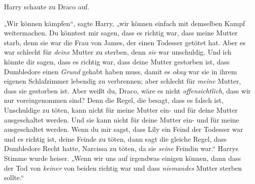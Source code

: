 Harry schaute zu Draco auf.

„Wir können kämpfen“, sagte Harry, „wir können einfach mit demselben Kampf weitermachen. Du könntest mir sagen, dass es richtig war, dass meine Mutter starb, denn sie war die Frau von James, der einen Todesser getötet hat. Aber es war schlecht für \emph{deine} Mutter zu sterben, denn \emph{sie} war unschuldig. Und ich könnte dir sagen, dass es richtig war, dass deine Mutter gestorben ist, dass Dumbledore einen \emph{Grund} gehabt haben muss, damit es \emph{okay} war sie in ihrem eigenen Schlafzimmer lebendig zu verbrennen; aber schlecht für \emph{meine} Mutter, dass sie gestorben ist. Aber weißt du, Draco, wäre es nicht \emph{offensichtlich}, dass wir nur voreingenommen sind? Denn die Regel, die besagt, dass es falsch ist, Unschuldige zu töten, kann nicht für meine Mutter ein- und für deine Mutter ausgeschaltet werden. Und sie kann nicht für deine Mutter ein- und für meine ausgeschaltet werden. Wenn du mir sagst, dass Lily ein Feind der Todesser war und es richtig ist, deine Feinde zu töten, dann sagt die gleiche Regel, dass Dumbledore Recht hatte, Narcissa zu töten, da sie \emph{seine} Feindin war.“ Harrys Stimme wurde heiser.
„Wenn wir uns auf irgendwas einigen können, dann dass der Tod von \emph{keiner} von beiden richtig war und dass \emph{niemandes} Mutter sterben sollte.“

\later

